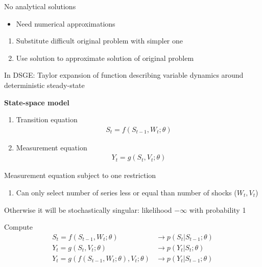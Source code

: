\documentclass{beamer}
\begin{document}
\begin{frame} 
  No analytical solutions
  \begin{itemize}
    \item Need numerical approximations
  \end{itemize}
  \medskip
  \begin{enumerate}
    \item Substitute difficult original problem with simpler one
    \item Use solution to approximate solution of original problem
  \end{enumerate}
  In DSGE: Taylor expansion of function describing variable dynamics around deterministic steady-state
\end{frame}


\begin{frame}
  \textbf{State-space model}
  \begin{enumerate}
    \item Transition equation
    \begin{align*}
      S_t=f(S_{t-1}, W_t; \theta)
    \end{align*}
    \item Measurement equation
    \begin{align*}
      Y_t=g(S_t, V_t;\theta)
    \end{align*}
  \end{enumerate}
  \medskip
  Measurement equation subject to one restriction
  \begin{enumerate}
    \item Can only select number of series less or equal than number of shocks ($W_t,V_t$)
  \end{enumerate}
  Otherwise it will be stochastically singular: likelihood $-\infty$ with probability 1
\end{frame}

\begin{frame}
  Compute
  \begin{align}
    S_t=f(S_{t-1}, W_t; \theta) &\rightarrow p(S_t|S_{t-1};\theta)\\
    Y_t=g(S_t, V_t;\theta) &\rightarrow p(Y_t|S_t;\theta)\\
    Y_t=g(f(S_{t-1},W_t;\theta),V_t;\theta) &\rightarrow p(Y_t|S_{t-1};\theta)
  \end{align}  
\end{frame}
\end{document}
